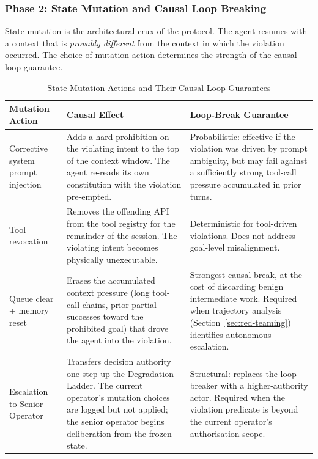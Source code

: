 \subsubsection*{Phase 2: State Mutation and Causal Loop Breaking}

State mutation is the architectural crux of the protocol.  The agent resumes
with a context that is \emph{provably different} from the context in which the
violation occurred.  The choice of mutation action determines the strength of
the causal-loop guarantee.

\begin{table}[h]
\caption{State Mutation Actions and Their Causal-Loop Guarantees}
\label{tab:mutation-actions}
\begin{tabular}{p{3.2cm} p{5.2cm} p{3.8cm}}
\toprule
\textbf{Mutation Action} & \textbf{Causal Effect} & \textbf{Loop-Break Guarantee} \\
\midrule
Corrective system prompt injection
  & Adds a hard prohibition on the violating intent to the top of the
    context window.  The agent re-reads its own constitution with the
    violation pre-empted.
  & Probabilistic: effective if the violation was driven by prompt
    ambiguity, but may fail against a sufficiently strong tool-call
    pressure accumulated in prior turns. \\
\addlinespace
Tool revocation
  & Removes the offending API from the tool registry for the remainder
    of the session.  The violating intent becomes physically
    unexecutable.
  & Deterministic for tool-driven violations.
    Does not address goal-level misalignment. \\
\addlinespace
Queue clear + memory reset
  & Erases the accumulated context pressure (long tool-call chains,
    prior partial successes toward the prohibited goal) that drove the
    agent into the violation.
  & Strongest causal break, at the cost of discarding benign
    intermediate work.  Required when trajectory analysis
    (Section~\ref{sec:red-teaming}) identifies autonomous escalation. \\
\addlinespace
Escalation to Senior Operator
  & Transfers decision authority one step up the Degradation Ladder.
    The current operator's mutation choices are logged but not applied;
    the senior operator begins deliberation from the frozen state.
  & Structural: replaces the loop-breaker with a higher-authority
    actor.  Required when the violation predicate is beyond the
    current operator's authorisation scope. \\
\bottomrule
\end{tabular}
\end{table}

